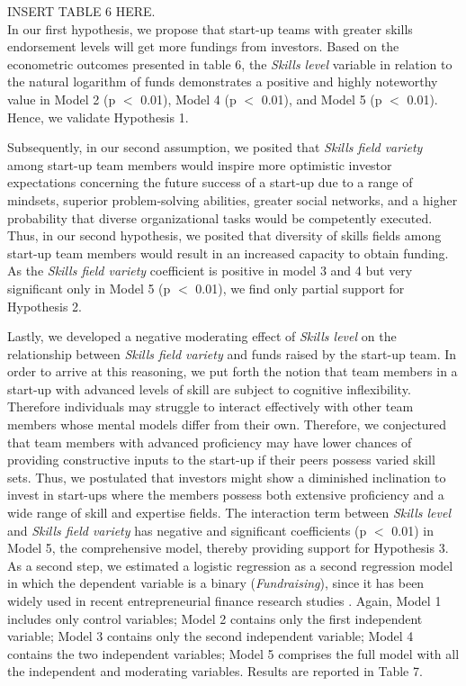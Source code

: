 \documentclass[12pt]{article}
\begin{document}
INSERT TABLE 6 HERE. \\

In our first hypothesis, we propose that start-up teams with greater skills endorsement levels will get more fundings from investors. Based on the econometric outcomes presented in table 6, the \textit{Skills level} variable in relation to the natural logarithm of funds demonstrates a positive and highly noteworthy value in Model 2 (p $<$ 0.01), Model 4 (p $<$ 0.01), and Model 5 (p $<$ 0.01). Hence, we validate Hypothesis 1.

Subsequently, in our second assumption, we posited that \textit{Skills field variety} among start-up team members would inspire more optimistic investor expectations concerning the future success of a start-up due to a range of mindsets, superior problem-solving abilities, greater social networks, and a higher probability that diverse organizational tasks would be competently executed. Thus, in our second hypothesis, we posited that diversity of skills fields among start-up team members would result in an increased capacity to obtain funding. As the \textit{Skills field variety} coefficient is positive in model 3 and 4 but very significant only in Model 5 (p $<$ 0.01), we find only partial support for Hypothesis 2.

Lastly, we developed a negative moderating effect of \textit{Skills level} on the relationship between \textit{Skills field variety} and funds raised by the start-up team. In order to arrive at this reasoning, we put forth the notion that team members in a start-up with advanced levels of skill are subject to cognitive inflexibility. Therefore individuals may struggle to interact effectively with other team members whose mental models differ from their own. Therefore, we conjectured that team members with advanced proficiency may have lower chances of providing constructive inputs to the start-up if their peers possess varied skill sets. Thus, we postulated that investors might show a diminished inclination to invest in start-ups where the members possess both extensive proficiency and a wide range of skill and expertise fields. The interaction term between \textit{Skills level} and \textit{Skills field variety} has negative and significant coefficients (p $<$ 0.01) in Model 5, the comprehensive model, thereby providing support for Hypothesis 3. \\

As a second step, we estimated a logistic regression as a second regression model in which the dependent variable is a binary (\textit{Fundraising}), since it has been widely used in recent entrepreneurial finance research studies \citep{ahlers2015signaling, islam2018signaling}. Again, Model 1 includes only control variables; Model 2 contains only the first independent variable; Model 3 contains only the second independent variable; Model 4 contains the two independent variables; Model 5 comprises the full model with all the independent and moderating variables. Results are reported in Table 7\label{table7}. \\
\end{document}
